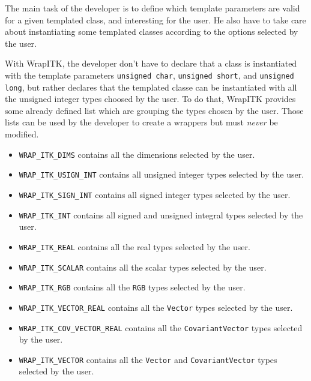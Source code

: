 \documentclass{InsightArticle}
\begin{document}
The main task of the developer is to define which template parameters are valid for a given
templated class, and interesting for the user. He also have to take care about
instantiating some templated classes according to the options selected by the user.

With WrapITK, the developer don't have to declare that a class is instantiated with the template parameters
\verb$unsigned char$, \verb$unsigned short$, and \verb$unsigned long$, but rather declares that the
templated classe can be instantiated with all the unsigned integer types choosed by the user.
To do that, WrapITK provides some already defined list which are grouping the types chosen by
the user. Those lists can be used by the developer to create a wrappers but must
{\em never} be modified.

\begin{itemize}
  \item \verb$WRAP_ITK_DIMS$ contains all the dimensions selected by the user.

  \item \verb$WRAP_ITK_USIGN_INT$ contains all unsigned integer types selected by the user.

  \item \verb$WRAP_ITK_SIGN_INT$ contains all signed integer types selected by the user.

  \item \verb$WRAP_ITK_INT$ contains all signed and unsigned integral types
selected by the user.

  \item \verb$WRAP_ITK_REAL$ contains all the real types selected by the user.

  \item \verb$WRAP_ITK_SCALAR$ contains all the scalar types selected by the user.

  \item \verb$WRAP_ITK_RGB$ contains all the \verb$RGB$ types selected by the user.

  \item \verb$WRAP_ITK_VECTOR_REAL$ contains all the \verb$Vector$ types selected
by the user.

  \item \verb$WRAP_ITK_COV_VECTOR_REAL$ contains all the \verb$CovariantVector$ types selected
by the user.

  \item \verb$WRAP_ITK_VECTOR$ contains all the \verb$Vector$ and
\verb$CovariantVector$ types selected by the user.


\end{itemize}
\end{document}
